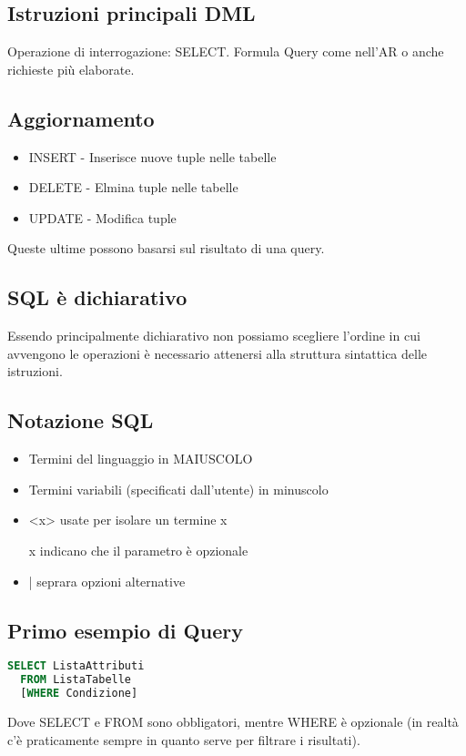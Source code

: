 \subsection{Istruzioni principali DML}
Operazione di interrogazione: SELECT. Formula Query come nell'AR o anche
richieste più elaborate.\\
\subsection*{Aggiornamento}
\begin{itemize}
  \item INSERT - Inserisce nuove tuple nelle tabelle
  \item DELETE - Elmina tuple nelle tabelle
  \item UPDATE - Modifica tuple
\end{itemize}
Queste ultime possono basarsi sul risultato di una query.
\subsection{SQL è dichiarativo}
Essendo principalmente dichiarativo non possiamo scegliere l'ordine in cui
avvengono le operazioni è necessario attenersi alla struttura sintattica delle
istruzioni.
\subsection{Notazione SQL}
\begin{itemize}
  \item Termini del linguaggio in MAIUSCOLO
  \item Termini variabili (specificati dall'utente) in minuscolo
  \item <x> usate per isolare un termine x
  \item [x] indicano che il parametro è opzionale
  \item | seprara opzioni alternative
\end{itemize}

\subsection{Primo esempio di Query}
\begin{lstlisting}[language=SQL]
  SELECT ListaAttributi
  FROM ListaTabelle
  [WHERE Condizione]
\end{lstlisting}
Dove SELECT e FROM sono obbligatori, mentre WHERE è opzionale (in realtà c'è praticamente
sempre in quanto serve per filtrare i risultati).\\
